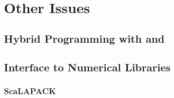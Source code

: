 \chapter{Other Issues}

\section{Hybrid Programming with {\MPI} and {\OMP}}

\subsection{{\MPI}}

\subsection{{\OMP}}

\section{Interface to Numerical Libraries}

\subsection{ScaLAPACK}

